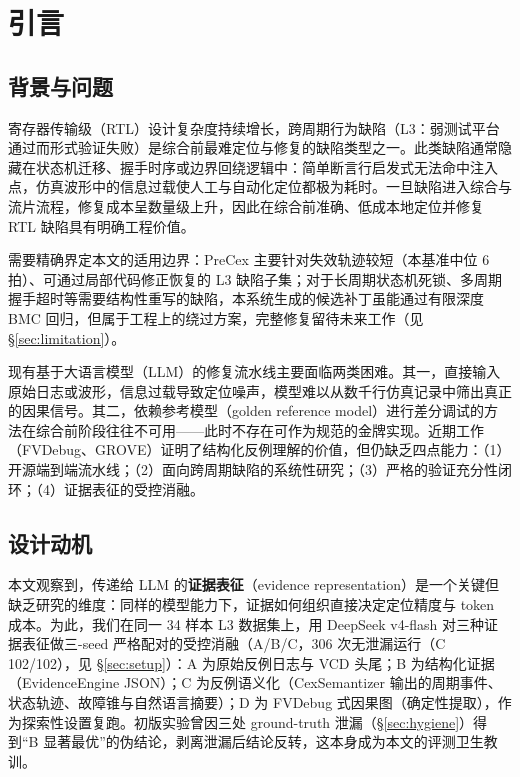 \documentclass[journal]{IEEEtran}
\begin{document}


\section{引言}

\subsection{背景与问题}

寄存器传输级（RTL）设计复杂度持续增长，跨周期行为缺陷（L3：弱测试平台通过而形式验证失败）是综合前最难定位与修复的缺陷类型之一。此类缺陷通常隐藏在状态机迁移、握手时序或边界回绕逻辑中：简单断言行启发式无法命中注入点，仿真波形中的信息过载使人工与自动化定位都极为耗时。一旦缺陷进入综合与流片流程，修复成本呈数量级上升，因此在综合前准确、低成本地定位并修复 RTL 缺陷具有明确工程价值。

需要精确界定本文的适用边界：PreCex 主要针对失效轨迹较短（本基准中位 6 拍）、可通过局部代码修正恢复的 L3 缺陷子集；对于长周期状态机死锁、多周期握手超时等需要结构性重写的缺陷，本系统生成的候选补丁虽能通过有限深度 BMC 回归，但属于工程上的绕过方案，完整修复留待未来工作（见 \S\ref{sec:limitation}）。

现有基于大语言模型（LLM）的修复流水线主要面临两类困难。其一，直接输入原始日志或波形，信息过载导致定位噪声，模型难以从数千行仿真记录中筛出真正的因果信号。其二，依赖参考模型（golden reference model）进行差分调试的方法在综合前阶段往往不可用——此时不存在可作为规范的金牌实现。近期工作（FVDebug、GROVE）证明了结构化反例理解的价值，但仍缺乏四点能力：（1）开源端到端流水线；（2）面向跨周期缺陷的系统性研究；（3）严格的验证充分性闭环；（4）证据表征的受控消融。

\subsection{设计动机}

本文观察到，传递给 LLM 的\textbf{证据表征}（evidence representation）是一个关键但缺乏研究的维度：同样的模型能力下，证据如何组织直接决定定位精度与 token 成本。为此，我们在同一 34 样本 L3 数据集上，用 DeepSeek v4-flash 对三种证据表征做三-seed 严格配对的受控消融（A/B/C，306 次无泄漏运行（C 102/102），见 \S\ref{sec:setup}）：A 为原始反例日志与 VCD 头尾；B 为结构化证据（EvidenceEngine JSON）；C 为反例语义化（CexSemantizer 输出的周期事件、状态轨迹、故障锥与自然语言摘要）；D 为 FVDebug 式因果图（确定性提取），作为探索性设置复跑。初版实验曾因三处 ground-truth 泄漏（\S\ref{sec:hygiene}）得到“B 显著最优”的伪结论，剥离泄漏后结论反转，这本身成为本文的评测卫生教训。
\end{document}
